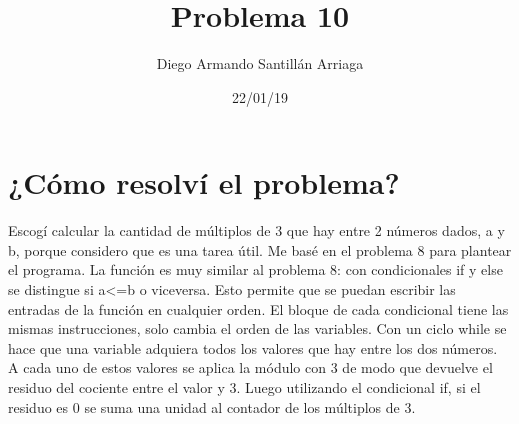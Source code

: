 \documentclass[letterpaper, 12pt, oneside]{article}%
\title{\Huge Problema 10}
\author{Diego Armando Santillán Arriaga}
\date{22/01/19}
\begin{document}
\maketitle
\newpage
\section*{¿Cómo resolví el problema?}
Escogí calcular la cantidad de múltiplos de 3 que hay entre 2 números dados, a y b, porque considero que es una tarea útil. Me basé en el problema 8 para plantear el programa. La función es muy similar al problema 8: con condicionales if y else se distingue si a<=b o viceversa. Esto permite que se puedan escribir las entradas de la función en cualquier orden. El bloque de cada condicional tiene las mismas instrucciones, solo cambia el orden de las variables. Con un ciclo while se hace que una variable adquiera todos los valores que hay entre los dos números. A cada uno de estos valores se aplica la módulo con 3 de modo que devuelve el residuo del cociente entre el valor y 3. Luego utilizando el condicional if, si el residuo es 0 se suma una unidad al contador de los múltiplos de 3.     


  
\end{document}
